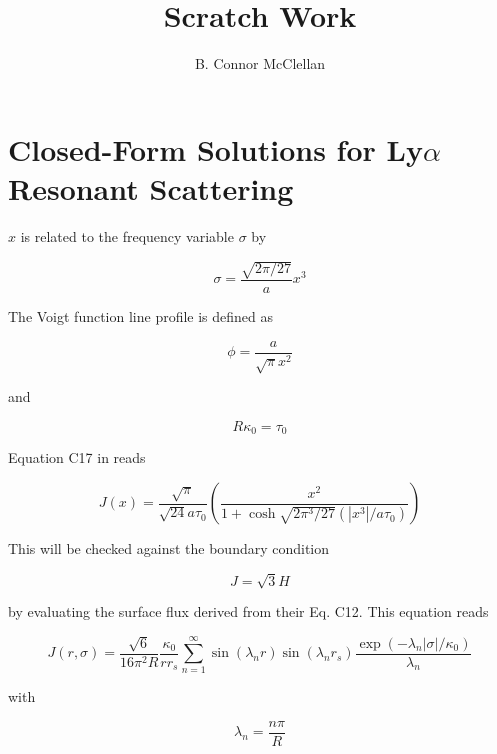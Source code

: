 \documentclass[onecolumn]{aastex63}
\begin{document}
\title{Scratch Work}
\author{B. Connor McClellan}
\keywords{}

\setlength\parindent{0pt}

\section{Closed-Form Solutions for Ly$\alpha$ Resonant Scattering}

$x$ is related to the frequency variable $\sigma$ by 

\begin{equation} \label{sigma}
    \sigma = \frac{\sqrt{2\pi/27}}{a} x^3
\end{equation}

The Voigt function line profile is defined as 

\begin{equation} \label{lineprofile}
    \phi = \frac{a}{\sqrt{\pi} x^2}
\end{equation}

and

\begin{equation} \label{tau}
    R\kappa_0 = \tau_0
\end{equation}

Equation C17 in \citet{2006ApJ...649...14D} reads

\begin{equation} \label{dijkstra}
    J(x) = \frac{\sqrt{\pi}}{\sqrt{24}a\tau_0}\left(\frac{x^2}{1 + \cosh{\sqrt{2\pi^3/27}(|x^3|/a\tau_0)}}\right)
\end{equation}

This will be checked against the boundary condition

\begin{equation} \label{bc}
    J = \sqrt{3} H
\end{equation}

by evaluating the surface flux derived from their Eq. C12. This equation reads 

\begin{equation} \label{c12}
    J(r, \sigma) = \frac{\sqrt{6}}{16 \pi^2 R} \frac{\kappa_0}{rr_s} \sum_{n=1}^{\infty}\sin(\lambda_n r) \sin(\lambda_n r_s) \frac{\exp{(-\lambda_n |\sigma|/\kappa_0)}}{\lambda_n}
\end{equation}

with

\begin{equation} \label{lambdan}
    \lambda_n = \frac{n\pi}{R}
\end{equation}
\end{document}

